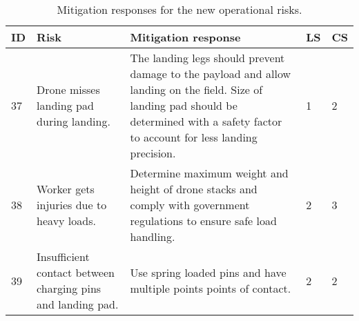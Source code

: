 



\begin{table}[h]
\centering
\caption{Mitigation responses for the new operational risks.}
\label{tab:mitigationnewoperations}
\begin{scriptsize}
\begin{tabular}{|p{0.4cm}|p{3cm}|p{9.2cm}|p{0.4cm}|p{0.4cm}|} 
\hline
\multicolumn{1}{|l|}{\textbf{ID}} & \textbf{Risk}                                               & \textbf{Mitigation response}                                                                                                                                                               & \multicolumn{1}{l|}{\textbf{LS}} & \multicolumn{1}{l|}{\textbf{CS}} \\ \hline
37                                & Drone misses landing pad during landing.                    & The landing legs should prevent damage to the payload and allow landing on the field. Size of landing pad should be determined with a safety factor to account for less landing precision. & 1                                & 2                                \\ \hline
38                                & Worker gets injuries due to heavy loads.                    & Determine maximum weight and height of drone stacks and comply with government regulations to ensure safe load handling.                                                                   & 2                                & 3                                \\ \hline
39                                & Insufficient contact between charging pins and landing pad. & Use spring loaded pins and have multiple points points of contact.                                                                                                                          & 2                                & 2                                \\ \hline

\end{tabular}
\end{scriptsize}
\end{table}

